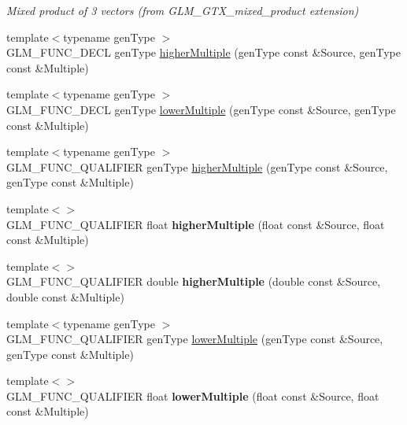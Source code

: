 \begin{DoxyCompactItemize}
\begin{DoxyCompactList}\small\item\em Mixed product of 3 vectors (from G\-L\-M\-\_\-\-G\-T\-X\-\_\-mixed\-\_\-product extension) \end{DoxyCompactList}\item 
{\footnotesize template$<$typename gen\-Type $>$ }\\G\-L\-M\-\_\-\-F\-U\-N\-C\-\_\-\-D\-E\-C\-L gen\-Type \hyperlink{group__gtx__multiple_gaa2bb85aaacfdb9366b8365f8d5c7e25d}{higher\-Multiple} (gen\-Type const \&Source, gen\-Type const \&Multiple)
\item 
{\footnotesize template$<$typename gen\-Type $>$ }\\G\-L\-M\-\_\-\-F\-U\-N\-C\-\_\-\-D\-E\-C\-L gen\-Type \hyperlink{group__gtx__multiple_ga11b955f3cb3589d561c8991118771ea6}{lower\-Multiple} (gen\-Type const \&Source, gen\-Type const \&Multiple)
\item 
{\footnotesize template$<$typename gen\-Type $>$ }\\G\-L\-M\-\_\-\-F\-U\-N\-C\-\_\-\-Q\-U\-A\-L\-I\-F\-I\-E\-R gen\-Type \hyperlink{group__gtx__multiple_gaa2bb85aaacfdb9366b8365f8d5c7e25d}{higher\-Multiple} (gen\-Type const \&Source, gen\-Type const \&Multiple)
\item 
\hypertarget{namespaceglm_a4afea9468d6dcf0048e2c06db79bc8c7}{{\footnotesize template$<$$>$ }\\G\-L\-M\-\_\-\-F\-U\-N\-C\-\_\-\-Q\-U\-A\-L\-I\-F\-I\-E\-R float {\bfseries higher\-Multiple} (float const \&Source, float const \&Multiple)}\label{namespaceglm_a4afea9468d6dcf0048e2c06db79bc8c7}

\item 
\hypertarget{namespaceglm_a2cd56fa0402782c78e225f1a551bbdc1}{{\footnotesize template$<$$>$ }\\G\-L\-M\-\_\-\-F\-U\-N\-C\-\_\-\-Q\-U\-A\-L\-I\-F\-I\-E\-R double {\bfseries higher\-Multiple} (double const \&Source, double const \&Multiple)}\label{namespaceglm_a2cd56fa0402782c78e225f1a551bbdc1}

\item 
{\footnotesize template$<$typename gen\-Type $>$ }\\G\-L\-M\-\_\-\-F\-U\-N\-C\-\_\-\-Q\-U\-A\-L\-I\-F\-I\-E\-R gen\-Type \hyperlink{group__gtx__multiple_ga11b955f3cb3589d561c8991118771ea6}{lower\-Multiple} (gen\-Type const \&Source, gen\-Type const \&Multiple)
\item 
\hypertarget{namespaceglm_ac3ba0c930ff55364862b250e88f742df}{{\footnotesize template$<$$>$ }\\G\-L\-M\-\_\-\-F\-U\-N\-C\-\_\-\-Q\-U\-A\-L\-I\-F\-I\-E\-R float {\bfseries lower\-Multiple} (float const \&Source, float const \&Multiple)}\label{namespaceglm_ac3ba0c930ff55364862b250e88f742df}


\end{DoxyCompactItemize}

